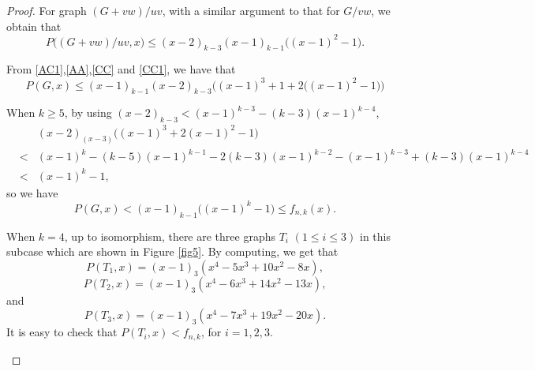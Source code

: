 \documentclass[12pt]{article}
\theoremstyle{definition}
\begin{document}
\begin{proof}
For graph $(G+vw)/uv$, with a similar argument to that for $G/vw$, we obtain that
\begin{equation}\label{CC1}P\big((G+vw)/uv,x\big)\leq (x-2)_{k-3}(x-1)_{k-1}\big((x-1)^2-1\big).\end{equation}

From \eqref{AC1},\eqref{AA},\eqref{CC} and \eqref{CC1}, we have that
\begin{equation}\label{R} P(G,x)\leq(x-1)_{k-1}(x-2)_{k-3}\Big((x-1)^3+1+2\big((x-1)^2-1\big)\Big)
\end{equation}

When $k\geq 5$, by using $(x-2)_{k-3}<(x-1)^{k-3}-(k-3)(x-1)^{k-4}$,
\begin{eqnarray*}&&(x-2)_{(x-3)}\big((x-1)^{3}+2(x-1)^2-1\big)\\
&<&(x-1)^k-(k-5)(x-1)^{k-1}-2(k-3)(x-1)^{k-2}-(x-1)^{k-3}+(k-3)(x-1)^{k-4}\\
&<&(x-1)^k-1,
\end{eqnarray*}
so we have
$$P(G,x)<(x-1)_{k-1}\big((x-1)^k-1\big)\leq f_{n,k}(x).$$

When $k=4$, up to isomorphism, there are three graphs $T_i$ $(1\leq i\leq 3)$ in this subcase which are shown in Figure \ref{fig5}.
By computing, we get that $$P(T_1,x)=(x-1)_3(x^4-5x^3+10x^2-8x),$$
$$P(T_2,x)=(x-1)_3(x^4-6x^3+14x^2-13x),$$ and $$P(T_3,x)=(x-1)_3(x^4-7x^3+19x^2-20x).$$
It is easy to check that $P(T_i,x)<f_{n,k}$, for $i=1,2,3.$


\begin{figure}[h!]
\begin{center}
\end{center}
\end{figure}
\end{proof}
\end{document}
